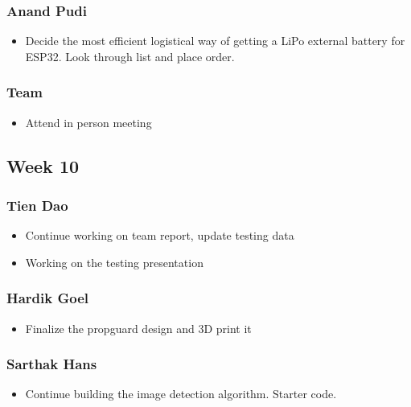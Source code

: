 \documentclass[12pt]{article}
\begin{document}
            \subsubsection*{Anand Pudi}
                \begin{itemize}
                    \item Decide the most efficient logistical way of getting a LiPo external battery for ESP32. Look through list and place order.
                \end{itemize}
            \subsubsection*{Team}
                \begin{itemize}
                    \item Attend in person meeting
                \end{itemize}

        \subsection*{Week 10}
            \subsubsection*{Tien Dao}
                \begin{itemize}
                    \item Continue working on team report, update testing data
                    \item Working on the testing presentation
                \end{itemize}
            \subsubsection*{Hardik Goel}
                \begin{itemize}
                    \item Finalize the propguard design and 3D print it
                \end{itemize}
            \subsubsection*{Sarthak Hans}
                \begin{itemize}
                    \item Continue building the image detection algorithm. Starter code.
                \end{itemize}
\end{document}
